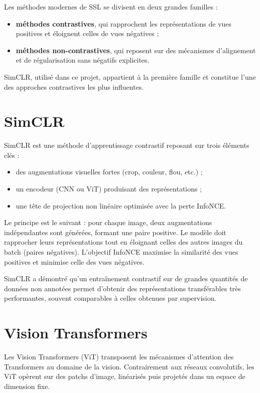 \documentclass[12pt,a4paper]{report}
\begin{document}
	Les méthodes modernes de SSL se divisent en deux grandes familles :
	\begin{itemize}
		\item \textbf{méthodes contrastives}, qui rapprochent les représentations de vues positives et éloignent celles de vues négatives ;
		\item \textbf{méthodes non-contrastives}, qui reposent sur des mécanismes d’alignement et de régularisation sans négatifs explicites.
	\end{itemize}
	
	SimCLR, utilisé dans ce projet, appartient à la première famille et constitue l’une des approches contrastives les plus influentes.
	
	\section{SimCLR}
	
	SimCLR \cite{chen2020simclr} est une méthode d’apprentissage contrastif reposant sur trois éléments clés :
	\begin{itemize}
		\item des augmentations visuelles fortes (crop, couleur, flou, etc.) ;
		\item un encodeur (CNN ou ViT) produisant des représentations ;
		\item une tête de projection non linéaire optimisée avec la perte InfoNCE.
	\end{itemize}
	
	Le principe est le suivant : pour chaque image, deux augmentations indépendantes sont générées, formant une paire positive. Le modèle doit rapprocher leurs représentations tout en éloignant celles des autres images du batch (paires négatives). L’objectif InfoNCE maximise la similarité des vues positives et minimise celle des vues négatives.
	
	SimCLR a démontré qu’un entraînement contrastif sur de grandes quantités de données non annotées permet d’obtenir des représentations transférables très performantes, souvent comparables à celles obtenues par supervision.
	
	\section{Vision Transformers}
	
	Les Vision Transformers (ViT) \cite{dosovitskiy2020vit} transposent les mécanismes d’attention des Transformers au domaine de la vision. Contrairement aux réseaux convolutifs, les ViT opèrent sur des patchs d’image, linéarisés puis projetés dans un espace de dimension fixe.
	
\end{document}
